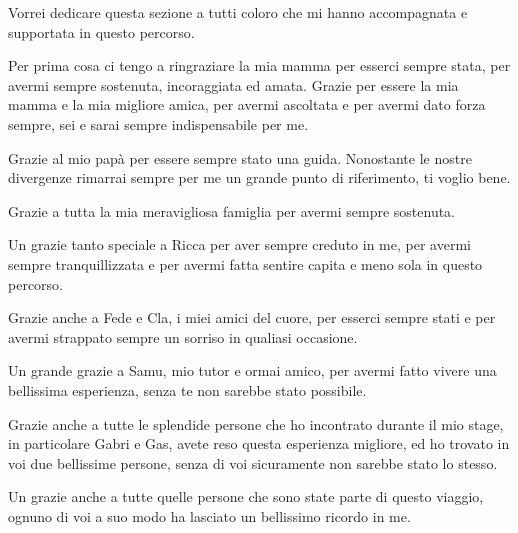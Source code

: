 \thispagestyle{plain}
Vorrei dedicare questa sezione a tutti coloro che mi hanno accompagnata e supportata in questo percorso. 


Per prima cosa ci tengo a ringraziare la mia mamma per esserci sempre stata, per avermi sempre sostenuta, incoraggiata ed amata. Grazie per essere la mia mamma e la mia migliore amica, per avermi ascoltata e per avermi dato forza sempre, sei e sarai sempre indispensabile per me.

Grazie al mio papà per essere sempre stato una guida. Nonostante le nostre divergenze rimarrai sempre per me un grande punto di riferimento, ti voglio bene.

Grazie a tutta la mia meravigliosa famiglia per avermi sempre sostenuta.

Un grazie tanto speciale a Ricca per aver sempre creduto in me, per avermi sempre tranquillizzata e per avermi fatta sentire capita e meno sola in questo percorso. 

Grazie anche a Fede e Cla, i miei amici del cuore, per esserci sempre stati e per avermi strappato sempre un sorriso in qualiasi occasione.

Un grande grazie a Samu, mio tutor e ormai amico, per avermi fatto vivere una bellissima esperienza, senza te non sarebbe stato possibile.

Grazie anche a tutte le splendide persone che ho incontrato durante il mio stage, in particolare Gabri e Gas, avete reso questa esperienza migliore, ed ho trovato in voi due bellissime persone, senza di voi sicuramente non sarebbe stato lo stesso.  

Un grazie anche a tutte quelle persone che sono state parte di questo viaggio, ognuno di voi a suo modo ha lasciato un bellissimo ricordo in me.

